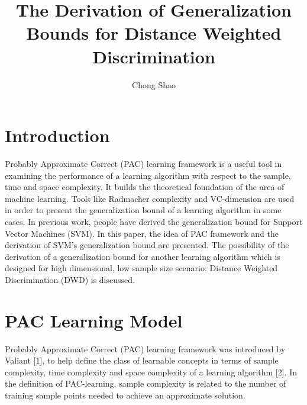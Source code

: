 \documentclass[12pt]{article}
\theoremstyle{definition}
\theoremstyle{remark}
\numberwithin{equation}{section}
\begin{document}
\title{The Derivation of Generalization Bounds for Distance Weighted Discrimination}%
\author{Chong Shao}%

\maketitle
\section{Introduction}
Probably Approximate Correct (PAC) learning framework is a useful tool in examining the performance of a learning algorithm with respect to the sample, time and space complexity. It builds the theoretical foundation of the area of machine learning. Tools like Radmacher complexity and VC-dimension are used in order to present the generalization bound of a learning algorithm in some cases. In previous work, people have derived the generalization bound for Support Vector Machines (SVM). In this paper, the idea of PAC framework and the derivation of SVM's generalization bound are presented. The possibility of the derivation of a generalization bound for another learning algorithm which is designed for high dimensional, low sample size scenario: Distance Weighted Discrimination (DWD) is discussed. 
\section{PAC Learning Model}
Probably Approximate Correct (PAC) learning framework was introduced by Valiant [1], to help define the class of learnable concepts in terms of sample complexity, time complexity and space complexity of a learning algorithm [2]. In the definition of PAC-learning, sample complexity is related to the number of training sample points needed to achieve an approximate solution.
\end{document}
